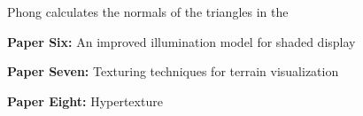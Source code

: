\documentclass{scrartcl}
\begin{document}
Phong calculates the normals of the triangles in the 

\par
\textbf{Paper Six:}
An improved illumination model for shaded display
\cite{whitted2005improved}
\par

\textbf{Paper Seven:}
Texturing techniques for terrain visualization
\cite{dollner2000texturing}
\par

\textbf{Paper Eight:}
Hypertexture
\cite{perlin1989hypertexture}




\end{document}
